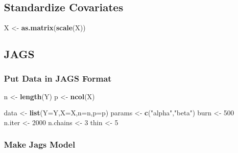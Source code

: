 \documentclass[
]{article}
\newenvironment{Shaded}{\begin{snugshade}}{\end{snugshade}}
\newcommand{\AttributeTok}[1]{\textcolor[rgb]{0.13,0.29,0.53}{#1}}
\newcommand{\DecValTok}[1]{\textcolor[rgb]{0.00,0.00,0.81}{#1}}
\newcommand{\FunctionTok}[1]{\textcolor[rgb]{0.13,0.29,0.53}{\textbf{#1}}}
\newcommand{\NormalTok}[1]{#1}
\newcommand{\OtherTok}[1]{\textcolor[rgb]{0.56,0.35,0.01}{#1}}
\newcommand{\StringTok}[1]{\textcolor[rgb]{0.31,0.60,0.02}{#1}}
\begin{document}
\subsection{Standardize Covariates}\label{standardize-covariates}

\begin{Shaded}
\begin{Highlighting}[]
\NormalTok{X }\OtherTok{\textless{}{-}} \FunctionTok{as.matrix}\NormalTok{(}\FunctionTok{scale}\NormalTok{(X))}
\end{Highlighting}
\end{Shaded}

\subsection{JAGS}\label{jags}

\subsubsection{Put Data in JAGS Format}\label{put-data-in-jags-format}

\begin{Shaded}
\begin{Highlighting}[]
\NormalTok{n }\OtherTok{\textless{}{-}} \FunctionTok{length}\NormalTok{(Y)}
\NormalTok{p }\OtherTok{\textless{}{-}} \FunctionTok{ncol}\NormalTok{(X)}

\NormalTok{data }\OtherTok{\textless{}{-}} \FunctionTok{list}\NormalTok{(}\AttributeTok{Y=}\NormalTok{Y,}\AttributeTok{X=}\NormalTok{X,}\AttributeTok{n=}\NormalTok{n,}\AttributeTok{p=}\NormalTok{p)}
\NormalTok{params }\OtherTok{\textless{}{-}} \FunctionTok{c}\NormalTok{(}\StringTok{"alpha"}\NormalTok{,}\StringTok{"beta"}\NormalTok{)}
\NormalTok{burn }\OtherTok{\textless{}{-}} \DecValTok{500}
\NormalTok{n.iter }\OtherTok{\textless{}{-}} \DecValTok{2000}
\NormalTok{n.chains }\OtherTok{\textless{}{-}} \DecValTok{3}
\NormalTok{thin }\OtherTok{\textless{}{-}} \DecValTok{5}
\end{Highlighting}
\end{Shaded}

\subsubsection{Make Jags Model}\label{make-jags-model}
\end{document}
